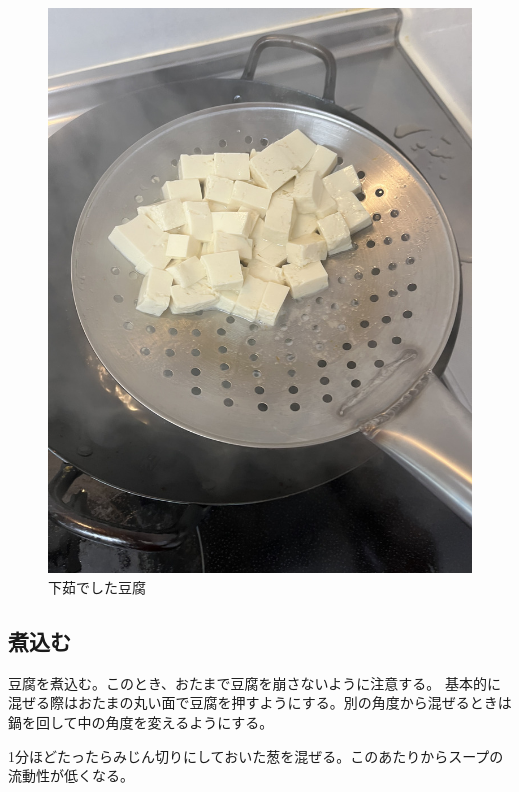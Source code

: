 \documentclass[a4paper,10pt,xelatex,ja=standard,twocolumn]{bxjsarticle}
\begin{document}
\begin{figure}[h]
  \caption{下茹でした豆腐}
  \label{tofu}
  \begin{center}
    \includegraphics[height=\linewidth]{IMG_4085.jpg}
  \end{center}
\end{figure}

\subsection{煮込む}

豆腐を煮込む。このとき、おたまで豆腐を崩さないように注意する。
基本的に混ぜる際はおたまの丸い面で豆腐を押すようにする。別の角度から混ぜるときは鍋を回して中の角度を変えるようにする。

1分ほどたったらみじん切りにしておいた葱を混ぜる。このあたりからスープの流動性が低くなる。
\end{document}
